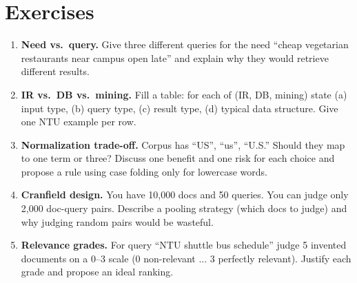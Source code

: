 \section{Exercises}
\begin{enumerate}[label=E1.\arabic*, leftmargin=*, itemsep=0.6em]
  \item \textbf{Need vs.\ query.} Give three different queries for the need ``cheap vegetarian restaurants near campus open late'' and explain why they would retrieve different results.
  \item \textbf{IR vs.\ DB vs.\ mining.} Fill a table: for each of (IR, DB, mining) state (a) input type, (b) query type, (c) result type, (d) typical data structure. Give one NTU example per row.
  \item \textbf{Normalization trade-off.} Corpus has ``US'', ``us'', ``U.S.'' Should they map to one term or three? Discuss one benefit and one risk for each choice and propose a rule using case folding only for lowercase words.
  \item \textbf{Cranfield design.} You have 10,000 docs and 50 queries. You can judge only 2,000 doc-query pairs. Describe a pooling strategy (which docs to judge) and why judging random pairs would be wasteful.
  \item \textbf{Relevance grades.} For query ``NTU shuttle bus schedule'' judge 5 invented documents on a 0--3 scale (0 non-relevant ... 3 perfectly relevant). Justify each grade and propose an ideal ranking.
\end{enumerate}

